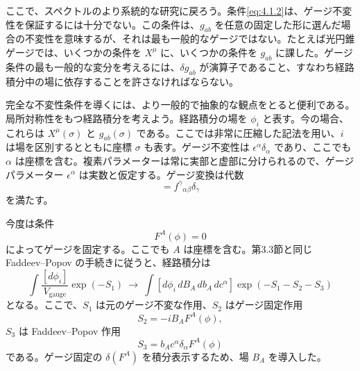 \label{sec:4.2}

ここで、スペクトルのより系統的な研究に戻ろう。条件\eqref{eq:4.1.2}は、ゲージ不変性を保証するには十分でない。この条件は、$g_{ab}$ を任意の固定した形に選んだ場合の不変性を意味するが、それは最も一般的なゲージではない。たとえば光円錐ゲージでは、いくつかの条件を $X^\mu$ に、いくつかの条件を $g_{ab}$ に課した。ゲージ条件の最も一般的な変分を考えるには、$\delta g_{ab}$ が演算子であること、すなわち経路積分中の場に依存することを許さなければならない。

完全な不変性条件を導くには、より一般的で抽象的な観点をとると便利である。局所対称性をもつ経路積分を考えよう。経路積分の場を $\phi_i$ と表す。今の場合、これらは $X^\mu(\sigma)$ と $g_{ab}(\sigma)$ である。ここでは非常に圧縮した記法を用い、$i$ は場を区別するとともに座標 $\sigma$ も表す。ゲージ不変性は $\epsilon^\alpha\delta_\alpha$ であり、ここでも $\alpha$ は座標を含む。複素パラメーターは常に実部と虚部に分けられるので、ゲージパラメーター $\epsilon^\alpha$ は実数と仮定する。ゲージ変換は代数
\begin{equation}
[\delta_\alpha,\delta_\beta]=f^\gamma{}_{\alpha\beta}\delta_\gamma
\tag{4.2.1}\label{eq:4.2.1}
\end{equation}
を満たす。

今度は条件
\begin{equation}
F^A(\phi)=0
\tag{4.2.2}\label{eq:4.2.2}
\end{equation}
によってゲージを固定する。ここでも $A$ は座標を含む。第3.3節と同じ Faddeev--Popov の手続きに従うと、経路積分は
\begin{equation}
\int\frac{[d\phi_i]}{V_{\text{gauge}}}\exp(-S_1)
\ \longrightarrow\
\int[d\phi_i\,dB_A\,db_A\,dc^\alpha]\exp(-S_1-S_2-S_3)
\tag{4.2.3}\label{eq:4.2.3}
\end{equation}
となる。ここで、$S_1$ は元のゲージ不変な作用、$S_2$ はゲージ固定作用
\begin{equation}
S_2=-iB_AF^A(\phi),
\tag{4.2.4}\label{eq:4.2.4}
\end{equation}
$S_3$ は Faddeev--Popov 作用
\begin{equation}
S_3=b_Ac^\alpha\delta_\alpha F^A(\phi)
\tag{4.2.5}\label{eq:4.2.5}
\end{equation}
である。ゲージ固定の $\delta(F^A)$ を積分表示するため、場 $B_A$ を導入した。

